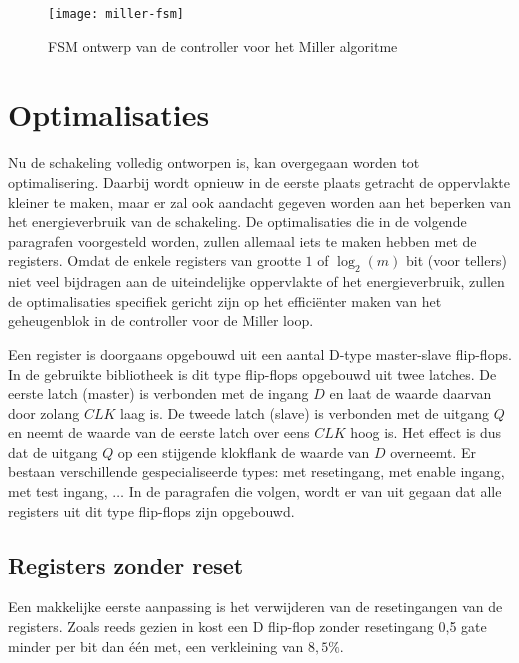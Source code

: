 \begin{figure}[h]
	\centering
		\texttt{[image: miller-fsm]}
		\caption{FSM ontwerp van de controller voor het Miller algoritme\label{figuur-miller-fsm}}
\end{figure}

\section{Optimalisaties\label{sectie-implementatie-optimalisaties}}

Nu de schakeling volledig ontworpen is, kan overgegaan worden tot optimalisering. Daarbij wordt opnieuw in de eerste plaats getracht de oppervlakte kleiner te maken, maar er zal ook aandacht gegeven worden aan het beperken van het energieverbruik van de schakeling. De optimalisaties die in de volgende paragrafen voorgesteld worden, zullen allemaal iets te maken hebben met de registers. Omdat de enkele registers van grootte $1$ of $\log _2(m)$ bit (voor tellers) niet veel bijdragen aan de uiteindelijke oppervlakte of het energieverbruik, zullen de optimalisaties specifiek gericht zijn op het effici\"enter maken van het geheugenblok in de controller voor de Miller loop.

Een register is doorgaans opgebouwd uit een aantal D-type master-slave flip-flops. In de gebruikte bibliotheek \cite{cell-databook} is dit type flip-flops opgebouwd uit twee latches. De eerste latch (master) is verbonden met de ingang $D$ en laat de waarde daarvan door zolang $CLK$ laag is. De tweede latch (slave) is verbonden met de uitgang $Q$  en neemt de waarde van de eerste latch over eens $CLK$ hoog is. Het effect is dus dat de uitgang $Q$ op een stijgende klokflank de waarde van $D$ overneemt. Er bestaan verschillende gespecialiseerde types: met resetingang, met enable ingang, met test ingang, $\ldots$ In de paragrafen die volgen, wordt er van uit gegaan dat alle registers uit dit type flip-flops zijn opgebouwd.

\subsection{Registers zonder reset}

Een makkelijke eerste aanpassing is het verwijderen van de resetingangen van de registers. Zoals reeds gezien in  kost een D flip-flop zonder resetingang 0,5 gate minder per bit dan \'e\'en met, een verkleining van $8,5\%$.

